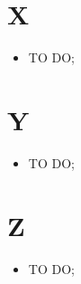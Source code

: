 \section*{X} %
\label{sec:x}
	\begin{itemize}
		\item TO DO;
	\end{itemize}
\pagebreak

\section*{Y} %
\label{sec:y}
	\begin{itemize}
		\item TO DO;
	\end{itemize}
\pagebreak

\section*{Z} %
\label{sec:z}
	\begin{itemize}
		\item TO DO;
	\end{itemize}
\pagebreak
